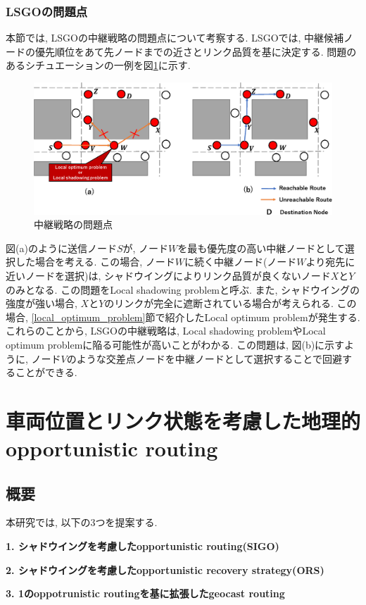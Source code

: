 \documentclass[10pt]{jreport}
\begin{document}
\subsection{LSGOの問題点}
本節では, LSGOの中継戦略の問題点について考察する. LSGOでは, 中継候補ノードの優先順位をあて先ノードまでの近さとリンク品質を基に決定する. 問題のあるシチュエーションの一例を図\ref{fig:LSGO-problem}に示す. 

\begin{figure}[!ht]
	\centering
	\includegraphics[width=160mm]{figures/LSGO_problem.eps}
	\caption{中継戦略の問題点}
	\label{fig:LSGO-problem}
\end{figure}

図(a)のように送信ノード$S$が, ノード$W$を最も優先度の高い中継ノードとして選択した場合を考える. この場合, ノード$W$に続く中継ノード(ノード$W$より宛先に近いノードを選択)は, シャドウイングによりリンク品質が良くないノード$X$と$Y$のみとなる. この問題をLocal shadowing problemと呼ぶ. また, シャドウイングの強度が強い場合, $X$と$Y$のリンクが完全に遮断されている場合が考えられる. この場合, \ref{local_optimum_problem}節で紹介したLocal optimum problemが発生する. これらのことから, LSGOの中継戦略は, Local shadowing problemやLocal optimum problemに陥る可能性が高いことがわかる. この問題は, 図(b)に示すように, ノード$V$のような交差点ノードを中継ノードとして選択することで回避することができる. 





\chapter{車両位置とリンク状態を考慮した地理的opportunistic routing}
\section{概要}
本研究では, 以下の3つを提案する. \par
\textbf{1. シャドウイングを考慮したopportunistic routing(SIGO)} \par
\textbf{2. シャドウイングを考慮したopportunistic recovery strategy(ORS)} \par
\textbf{3. 1のoppotrunistic routingを基に拡張したgeocast routing} \par
\end{document}

